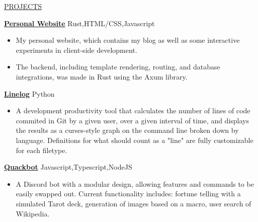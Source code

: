 \documentclass[11pt]{article}
\newcommand{\betteruline}[1]{
    \uline{#1}
}
\newcommand{\sectiontitle}[1]{
    \begingroup
        \titlebold
        \betteruline{\Large\uppercase{#1}  }
        \vspace{1.7mm}
    \endgroup
}
\newcommand{\sectioncontent}[1]{
    \begingroup
        \begin{FlushLeft}
        \vspace{-3mm}
        \sffamily\small#1
        \end{FlushLeft}
    \endgroup
    \vspace{2mm}
}
\newcommand{\project}[2]{
    \begingroup
        \textbf{\small#1}
        \hfill\color{black!70}\small{#2}
    \endgroup
}
\newcommand{\spacevv}{
    \vspace{2mm}
}
\begin{document}
\begin{paracol}{2}
        
    \sectiontitle{projects}
    \sectioncontent{

    
      
        
          \project{ \href{https://implicit.computer}{Personal Website} }{ Rust,HTML/CSS,Javascript  }
        \begin{itemize}

            
              

              \item My personal website, which contains my blog as well as some interactive experiments in client-side development.

                

              \item The backend, including template rendering, routing, and database integrations, was made in Rust using the Axum library.

                
            

        \end{itemize}

        
        \spacevv
        

    
        
          \project{ \href{https://github.com/keagud/linelog}{Linelog} }{ Python  }
        \begin{itemize}

            
              

              \item A development productivity tool that calculates the number of lines of code commited in Git by a given user, over a given interval of time, and displays the results as a curses-style graph on the command line broken down by language. Definitions for what should count as a "line" are fully customizable for each filetype.

                
            

        \end{itemize}

        
        \spacevv
        

    
        
          \project{ \href{https://github.com/keagud/quackbot}{Quackbot} }{ Javascript,Typescript,NodeJS  }
        \begin{itemize}

            
              

              \item A Discord bot with a modular design, allowing features and commands to be easily swapped out. Current functionality includes: fortune telling with a simulated Tarot deck, generation of images based on a macro, user search of Wikipedia.


\end{itemize}}
\end{paracol}
\end{document}
